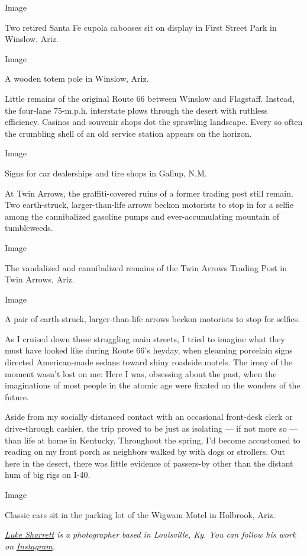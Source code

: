 Image

Two retired Santa Fe cupola cabooses sit on display in First Street Park
in Winslow, Ariz.

Image

A wooden totem pole in Winslow, Ariz.

Little remains of the original Route 66 between Winslow and Flagstaff.
Instead, the four-lane 75-m.p.h. interstate plows through the desert
with ruthless efficiency. Casinos and souvenir shops dot the sprawling
landscape. Every so often the crumbling shell of an old service station
appears on the horizon.

Image

Signs for car dealerships and tire shops in Gallup, N.M.

At Twin Arrows, the graffiti-covered ruins of a former trading post
still remain. Two earth-struck, larger-than-life arrows beckon motorists
to stop in for a selfie among the cannibalized gasoline pumps and
ever-accumulating mountain of tumbleweeds.

Image

The vandalized and cannibalized remains of the Twin Arrows Trading Post
in Twin Arrows, Ariz.

Image

A pair of earth-struck, larger-than-life arrows beckon motorists to stop
for selfies.

As I cruised down these struggling main streets, I tried to imagine what
they must have looked like during Route 66's heyday, when gleaming
porcelain signs directed American-made sedans toward shiny roadside
motels. The irony of the moment wasn't lost on me: Here I was, obsessing
about the past, when the imaginations of most people in the atomic age
were fixated on the wonders of the future.

Aside from my socially distanced contact with an occasional front-desk
clerk or drive-through cashier, the trip proved to be just as isolating
--- if not more so --- than life at home in Kentucky. Throughout the
spring, I'd become accustomed to reading on my front porch as neighbors
walked by with dogs or strollers. Out here in the desert, there was
little evidence of passers-by other than the distant hum of big rigs on
I-40.

Image

Classic cars sit in the parking lot of the Wigwam Motel in Holbrook,
Ariz.

\href{https://www.lukesphoto.com/}{\emph{Luke Sharrett}} \emph{is a
photographer based in Louisville, Ky. You can follow his work on}
\href{https://www.instagram.com/howdyluke/}{\emph{Instagram}}\emph{.}

